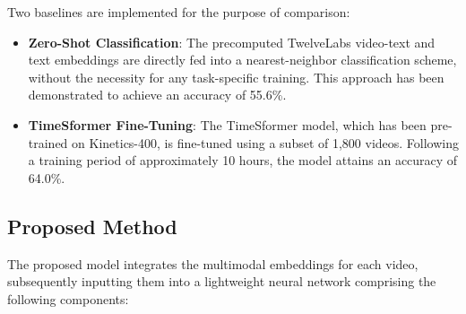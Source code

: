 
Two baselines are implemented for the purpose of comparison:

    

\begin{itemize}
    \item \textbf{Zero-Shot Classification}: The precomputed TwelveLabs video-text and text embeddings are directly fed into a nearest-neighbor classification scheme, without the necessity for any task-specific training. This approach has been demonstrated to achieve an accuracy of 55.6\%.
    \item \textbf{TimeSformer Fine-Tuning}: The TimeSformer model, which has been pre-trained on Kinetics-400, is fine-tuned using a subset of 1,800 videos. Following a training period of approximately 10 hours, the model attains an accuracy of 64.0\%.
\end{itemize}

\subsection{Proposed Method}


The proposed model integrates the multimodal embeddings for each video, subsequently inputting them into a lightweight neural network comprising the following components:


